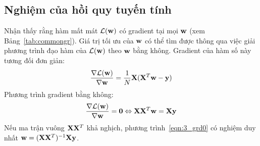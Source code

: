 



\subsection{Nghiệm của hồi quy tuyến tính}
Nhận thấy rằng hàm mất mát $\mathcal{L}(\mathbf{w})$ có gradient tại mọi $\mathbf{w}$ (xem
Bảng~\ref{tab:commongr}). Giá trị tối ưu của $\mathbf{w}$ có thể tìm được thông qua việc giải phương trình đạo hàm của $\mathcal{L}(\mathbf{w})$ theo $\mathbf{w}$ bằng
không. Gradient của hàm số này tương đối đơn giản:
\begin{equation}
\frac{\nabla \mathcal{L}(\mathbf{w})}{\nabla \mathbf{w}} = \frac{1}{N}\mathbf{X}(\mathbf{X}^T\mathbf{w} - \mathbf{y})
\end{equation}
Phương trình gradient bằng không:
\begin{equation}
\label{eqn:3_grd0}
\frac{\nabla \mathcal{L}(\mathbf{w})}{\nabla \mathbf{w}} = \mathbf{0}
\Leftrightarrow \mathbf{X}\mathbf{X}^T\mathbf{w} = \mathbf{X}\mathbf{y}
\end{equation}
{Nếu ma trận vuông $\mathbf{X}\mathbf{X}^T$ khả nghịch}, phương trình~\eqref{eqn:3_grd0} có
nghiệm duy nhất $\mathbf{w} = (\mathbf{X}\mathbf{X}^T)^{-1}\mathbf{X}\mathbf{y}$.

